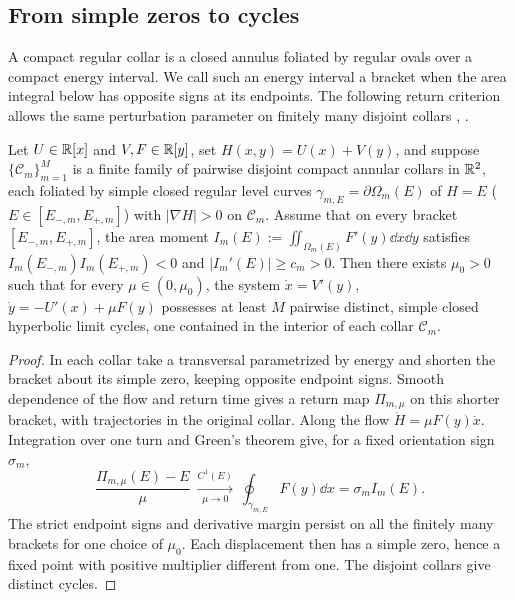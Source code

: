 \subsection{From simple zeros to cycles}\label{sec:regular-ovals}
A compact regular collar is a closed annulus foliated by regular ovals over a compact energy interval. We call such an energy interval a bracket when the area integral below has opposite signs at its endpoints. The following return criterion allows the same perturbation parameter on finitely many disjoint collars \cite[p.~143]{ChristopherLiTorregrosa2024}, \cite[Theorem~3, (5)]{GasullSantana2024}.
\begin{lemma}
Let $U\in\mathbb{R}[x]$\label{lem:hyperbolic-return} and $V,F\in\mathbb{R}[y]$, set $H(x,y)=U(x)+V(y)$, and suppose $\{\mathcal{C}_m\}_{m=1}^M$ is a finite family of pairwise disjoint compact annular collars in $\mathbb{R}^2$, each foliated by simple closed regular level curves $\gamma_{m,E}=\partial\Omega_m(E)$ of $H=E$ ($E\in[E_{-,m},E_{+,m}]$) with $|\nabla H|>0$ on $\mathcal{C}_m$. Assume that on every bracket $[E_{-,m},E_{+,m}]$, the area moment $I_m(E):=\iint_{\Omega_m(E)} F'(y)\dd x\dd y$ satisfies $I_m(E_{-,m})I_m(E_{+,m})<0$ and $|I_m'(E)|\ge c_m>0$. Then there exists $\mu_0>0$ such that for every $\mu\in(0,\mu_0)$, the system $\dot{x}=V'(y)$, $\dot{y}=-U'(x)+\mu F(y)$ possesses at least $M$ pairwise distinct, simple closed hyperbolic limit cycles, one contained in the interior of each collar $\mathcal{C}_m$.
\end{lemma}

\begin{proof}
In each collar take a transversal parametrized by energy and shorten the bracket about its simple zero, keeping opposite endpoint signs. Smooth dependence of the flow and return time gives a return map \(\Pi_{m,\mu}\) on this shorter bracket, with trajectories in the original collar. Along the flow \(\dot H=\mu F(y)\dot x\). Integration over one turn and Green's theorem give, for a fixed orientation sign \(\sigma_m\),
\[
 \frac{\Pi_{m,\mu}(E)-E}{\mu}
       \ \xrightarrow[\mu\to0]{C^1(E)}\ \oint_{\gamma_{m,E}}F(y)\dd x
       =\sigma_m I_m(E).
\]
The strict endpoint signs and derivative margin persist on all the finitely many brackets for one choice of \(\mu_0\). Each displacement then has a simple zero, hence a fixed point with positive multiplier different from one. The disjoint collars give distinct cycles.
\end{proof}

